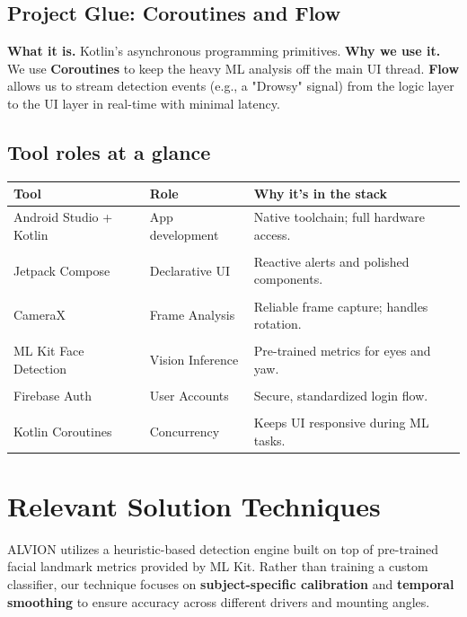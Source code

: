 \documentclass[11pt]{report}
\begin{document}
\subsection{Project Glue: Coroutines and Flow}
\textbf{What it is.} Kotlin’s asynchronous programming primitives.
\textbf{Why we use it.} We use \textbf{Coroutines} to keep the heavy ML analysis off the main UI thread. \textbf{Flow} allows us to stream detection events (e.g., a "Drowsy" signal) from the logic layer to the UI layer in real-time with minimal latency.

\subsection*{Tool roles at a glance}
\begin{center}
    \begin{tabular}{p{4.0cm} p{5.0cm} p{6.4cm}}
        \toprule
        \textbf{Tool} & \textbf{Role} & \textbf{Why it’s in the stack} \\
        \midrule
        Android Studio + Kotlin & App development & Native toolchain; full hardware access.\\
        \\
        Jetpack Compose & Declarative UI & Reactive alerts and polished components.\\
        \\
        CameraX & Frame Analysis & Reliable frame capture; handles rotation.\\
        \\
        ML Kit Face Detection & Vision Inference & Pre-trained metrics for eyes and yaw.\\
        \\
        Firebase Auth & User Accounts & Secure, standardized login flow.\\
        \\
        Kotlin Coroutines & Concurrency & Keeps UI responsive during ML tasks.\\
        \bottomrule
    \end{tabular}
\end{center}

\section{Relevant Solution Techniques}\label{sec:solutions}
ALVION utilizes a heuristic-based detection engine built on top of pre-trained facial landmark metrics provided by ML Kit. Rather than training a custom classifier, our technique focuses on \textbf{subject-specific calibration} and \textbf{temporal smoothing} to ensure accuracy across different drivers and mounting angles.
\end{document}
